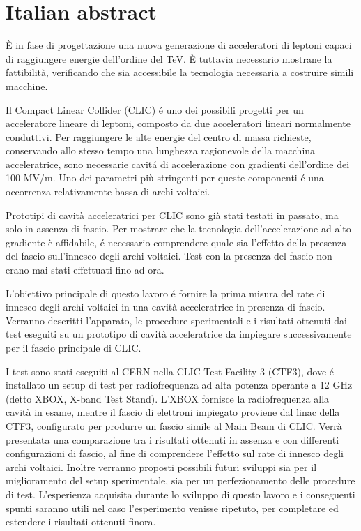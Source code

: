 \chapter*{Italian abstract}

\`E in fase di progettazione una nuova generazione di acceleratori di leptoni capaci di raggiungere energie dell'ordine del TeV. \`E tuttavia necessario mostrane la fattibilit\`a, verificando che sia accessibile la tecnologia necessaria a costruire simili macchine.

Il Compact Linear Collider (CLIC) é uno dei possibili progetti per un acceleratore lineare di leptoni, composto da due acceleratori lineari normalmente conduttivi. Per raggiungere le alte energie del centro di massa richieste, conservando allo stesso tempo una lunghezza ragionevole della macchina acceleratrice, sono necessarie cavitá di accelerazione con gradienti dell'ordine dei 100 MV/m. Uno dei parametri pi\`u stringenti per queste componenti é una occorrenza relativamente bassa di archi voltaici.

Prototipi di cavit\`a acceleratrici per CLIC sono gi\`a stati testati in passato, ma solo in assenza di fascio. Per mostrare che la tecnologia dell'accelerazione ad alto gradiente \`e affidabile, é necessario comprendere quale sia l'effetto della presenza del fascio sull'innesco degli archi voltaici. Test con la presenza del fascio non erano mai stati effettuati fino ad ora.

L'obiettivo principale di questo lavoro é fornire la prima misura del rate di innesco degli archi voltaici in una cavit\`a acceleratrice in presenza di fascio. Verranno descritti l'apparato, le procedure sperimentali e i risultati ottenuti dai test eseguiti su un prototipo di cavit\`a acceleratrice da impiegare successivamente per il fascio principale di CLIC.

I test sono stati eseguiti al CERN nella CLIC Test Facility 3 (CTF3), dove é installato un setup di test per radiofrequenza ad alta potenza operante a 12 GHz (detto XBOX, X-band Test Stand). L'XBOX fornisce la radiofrequenza alla cavit\`a in esame, mentre il fascio di elettroni impiegato proviene dal linac della CTF3, configurato per produrre un fascio simile al Main Beam di CLIC. Verr\`a presentata una comparazione tra i risultati ottenuti in assenza e con differenti configurazioni di fascio, al fine di comprendere l'effetto sul rate di innesco degli archi voltaici. Inoltre verranno proposti possibili futuri sviluppi sia per il miglioramento del setup sperimentale, sia per un perfezionamento delle procedure di test. L'esperienza acquisita durante lo sviluppo di questo lavoro e i conseguenti spunti saranno utili nel caso l'esperimento venisse ripetuto, per completare ed estendere i risultati ottenuti finora.